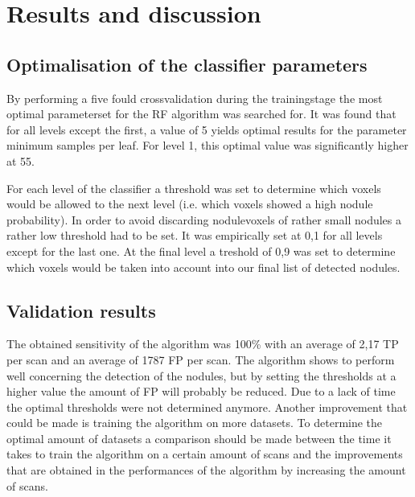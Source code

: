 \section{Results and discussion}
\subsection{Optimalisation of the classifier parameters}
By performing a five fould crossvalidation during the trainingstage the most
optimal parameterset for the RF algorithm was searched for.  It was found that
for all levels except the first, a value of 5 yields optimal results for the
parameter minimum samples per leaf. For level 1, this optimal value was
significantly higher at 55. %

For each level of the classifier a threshold was set to determine which voxels
would be allowed to the next level (i.e. which voxels showed a high nodule
probability). In order to avoid discarding nodulevoxels of rather small nodules
a rather low threshold had to be set. It was empirically set at 0,1 for all
levels except for the last one. At the final level a treshold of 0,9 was set to
determine which voxels would be taken into account into our final list of
detected nodules.
 
\subsection{Validation results}
The obtained sensitivity of the algorithm was 100\% with an average of 2,17 TP
per scan and an average of 1787 FP per scan. %
The algorithm shows to perform well concerning the detection of the nodules, but
by setting the thresholds at a higher value the amount of FP will probably be
reduced. Due to a lack of time the optimal thresholds were not determined
anymore. Another improvement that could be made is training the algorithm on
more datasets. To determine the optimal amount of datasets a comparison should
be made between the time it takes to train the algorithm on a certain amount of
scans and the improvements that are obtained in the performances of the
algorithm by increasing the amount of scans.

